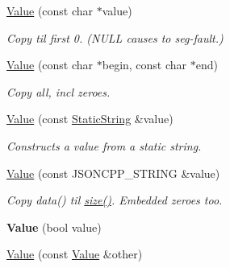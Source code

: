 \begin{DoxyCompactItemize}
\item 
\hyperlink{classJson_1_1Value_ad87b849356816aca75995dd07302e49d}{Value} (const char $\ast$value)\hypertarget{classJson_1_1Value_ad87b849356816aca75995dd07302e49d}{}\label{classJson_1_1Value_ad87b849356816aca75995dd07302e49d}

\begin{DoxyCompactList}\small\item\em Copy til first 0. (N\+U\+LL causes to seg-\/fault.) \end{DoxyCompactList}\item 
\hyperlink{classJson_1_1Value_a39fa09d1902efbd4350e1236db920571}{Value} (const char $\ast$begin, const char $\ast$end)\hypertarget{classJson_1_1Value_a39fa09d1902efbd4350e1236db920571}{}\label{classJson_1_1Value_a39fa09d1902efbd4350e1236db920571}

\begin{DoxyCompactList}\small\item\em Copy all, incl zeroes. \end{DoxyCompactList}\item 
\hyperlink{classJson_1_1Value_a081830e95f88a37054da7e46c65b0766}{Value} (const \hyperlink{classJson_1_1StaticString}{Static\+String} \&value)
\begin{DoxyCompactList}\small\item\em Constructs a value from a static string. \end{DoxyCompactList}\item 
\hyperlink{classJson_1_1Value_a89ef37969ff7c6eb3a7afcca03d4cd4a}{Value} (const J\+S\+O\+N\+C\+P\+P\+\_\+\+S\+T\+R\+I\+NG \&value)\hypertarget{classJson_1_1Value_a89ef37969ff7c6eb3a7afcca03d4cd4a}{}\label{classJson_1_1Value_a89ef37969ff7c6eb3a7afcca03d4cd4a}

\begin{DoxyCompactList}\small\item\em Copy data() til \hyperlink{classJson_1_1Value_a4ca8ee6c48a34ca6c2f131956bab5e05}{size()}. Embedded zeroes too. \end{DoxyCompactList}\item 
{\bfseries Value} (bool value)\hypertarget{classJson_1_1Value_a350a31ea4a30d384994b0bc010b17495}{}\label{classJson_1_1Value_a350a31ea4a30d384994b0bc010b17495}

\item 
\hyperlink{classJson_1_1Value_a436dfd3670f95fd665f680eba5cebcf0}{Value} (const \hyperlink{classJson_1_1Value}{Value} \&other)\hypertarget{classJson_1_1Value_a436dfd3670f95fd665f680eba5cebcf0}{}\label{classJson_1_1Value_a436dfd3670f95fd665f680eba5cebcf0}


\end{DoxyCompactItemize}
